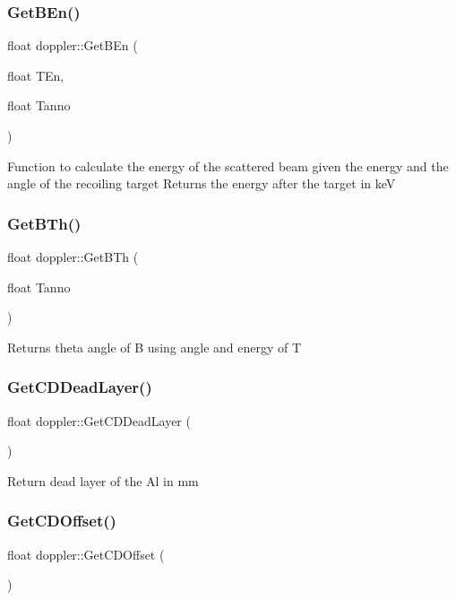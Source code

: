 \subsubsection{\texorpdfstring{Get\+B\+En()}{GetBEn()}}
{\footnotesize\ttfamily float doppler\+::\+Get\+B\+En (\begin{DoxyParamCaption}\item[{float}]{T\+En,  }\item[{float}]{Tanno }\end{DoxyParamCaption})}

Function to calculate the energy of the scattered beam given the energy and the angle of the recoiling target Returns the energy after the target in keV \mbox{\label{classdoppler_ac834d80156ae80009b508ae41fedde3d}} 
\subsubsection{\texorpdfstring{Get\+B\+Th()}{GetBTh()}}
{\footnotesize\ttfamily float doppler\+::\+Get\+B\+Th (\begin{DoxyParamCaption}\item[{float}]{Tanno }\end{DoxyParamCaption})}

Returns theta angle of B using angle and energy of T \mbox{\label{classdoppler_a2c1aef6db4ad3fc0c98e91d995992706}} 
\subsubsection{\texorpdfstring{Get\+C\+D\+Dead\+Layer()}{GetCDDeadLayer()}}
{\footnotesize\ttfamily float doppler\+::\+Get\+C\+D\+Dead\+Layer (\begin{DoxyParamCaption}{ }\end{DoxyParamCaption})}

Return dead layer of the Al in mm \mbox{\label{classdoppler_ac7725720fab82af5a5a6f02041bc9483}} 
\subsubsection{\texorpdfstring{Get\+C\+D\+Offset()}{GetCDOffset()}}
{\footnotesize\ttfamily float doppler\+::\+Get\+C\+D\+Offset (\begin{DoxyParamCaption}{ }\end{DoxyParamCaption})}

